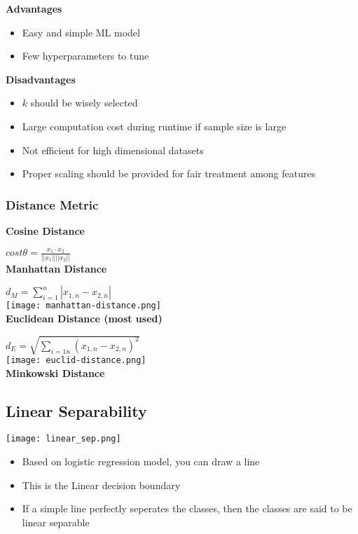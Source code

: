 \textbf{Advantages}
\begin{itemize}
    \item Easy and simple ML model
    \item Few hyperparameters to tune
\end{itemize}
\vspace{10pt}
\textbf{Disadvantages}
\begin{itemize}
    \item $k$ should be wisely selected
    \item Large computation cost during runtime if sample size is large
    \item Not efficient for high dimensional datasets
    \item Proper scaling should be provided for fair treatment among features
\end{itemize}

\subsubsection{Distance Metric}
\textbf{Cosine Distance}

$cost \theta = \frac{x_1 \cdot x_2}{||x_1|| ||x_2||}$ \\

\textbf{Manhattan Distance}

$d_M = \sum_{i=1}^{n}| x_{1,n} - x_{2,n} |$ \\

\texttt{[image: manhattan-distance.png]} \\

\columnbreak
\textbf{Euclidean Distance (most used)}

$d_E = \sqrt{\sum_{i=1n}^{}(x_{1,n} - x_{2,n})^2}$ \\

\texttt{[image: euclid-distance.png]} \\

\textbf{Minkowski Distance}

\subsection{Linear Separability}
\texttt{[image: linear\_sep.png]}

\begin{itemize}
    \item Based on logistic regression model, you can draw a line
    \item This is the Linear decision boundary
    \item If a simple line perfectly seperates the classes, then the classes are said to be linear separable
\end{itemize}

